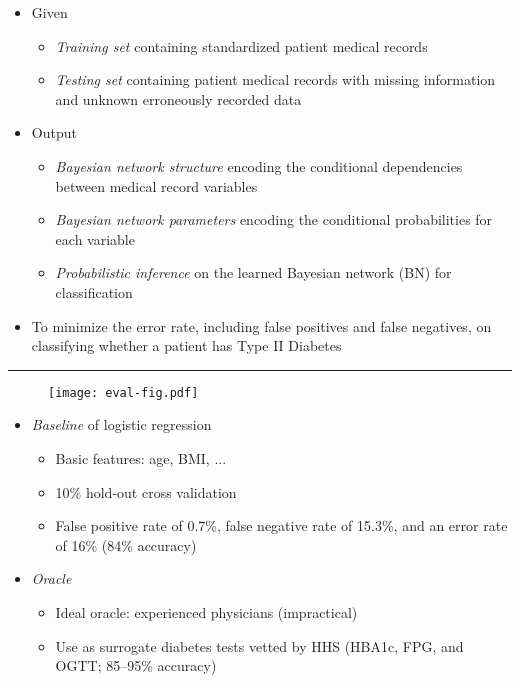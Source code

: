 \documentclass[a0]{a0poster}
\def\Head#1{\noindent{\LARGE\color{bluegray} #1}\bigskip}
\begin{document}
\begin{textblock}{7.0}
\begin{itemize}
  \item Given
  \begin{itemize}
    \item \emph{Training set} containing standardized patient medical records
    \item \emph{Testing set} containing patient medical records with missing information and unknown erroneously recorded data
  \end{itemize}

  \item Output
  \begin{itemize}
    \item \emph{Bayesian network structure} encoding the conditional dependencies between medical record variables
    \item \emph{Bayesian network parameters} encoding the conditional probabilities for each variable
    \item \emph{Probabilistic inference} on the learned Bayesian network (BN) for classification
  \end{itemize}

  \item To minimize the error rate, including false positives and false negatives, on classifying whether a patient has Type II Diabetes

\end{itemize}

\medskip
\hrule\medskip
\Head{Evaluation Criteria}

\begin{figure}[!h]
  \centering
  \texttt{[image: eval-fig.pdf]}
  \label{fig2}
\end{figure}

\begin{multicols}{2}
  \begin{itemize}
    
    \item \emph{Baseline} of logistic regression
    \begin{itemize}
      \item Basic features: age, BMI, ...
      \item 10\% hold-out cross validation
      \item False positive rate of 0.7\%, false negative rate of 15.3\%, and an error rate of 16\% (84\% accuracy)
    \end{itemize}

    \item \emph{Oracle}
    \begin{itemize}
      \item Ideal oracle: experienced physicians (impractical)
      \item Use as surrogate diabetes tests vetted by HHS (HBA1c, FPG, and OGTT; 85--95\% accuracy)
    \end{itemize}

  \end{itemize}
\end{multicols}

\end{textblock}
\end{document}

